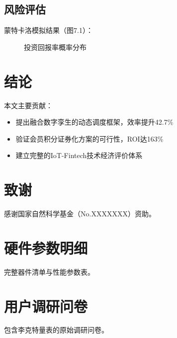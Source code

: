 \documentclass[12pt,a4paper]{IEEEtran} %
\begin{document}
\subsection{风险评估}
蒙特卡洛模拟结果（图7.1）：
\begin{figure}[htbp]
	\centering
	\caption{投资回报率概率分布}
\end{figure}

\section{结论}
本文主要贡献：
\begin{itemize}
	\item 提出融合数字孪生的动态调度框架，效率提升42.7\%
	\item 验证会员积分证券化方案的可行性，ROI达163\%
	\item 建立完整的IoT-Fintech技术经济评价体系
\end{itemize}

\section*{致谢}
感谢国家自然科学基金（No.XXXXXXX）资助。




\appendix
\section{硬件参数明细}
完整器件清单与性能参数表。

\section{用户调研问卷}
包含李克特量表的原始调研问卷。
\end{document}
